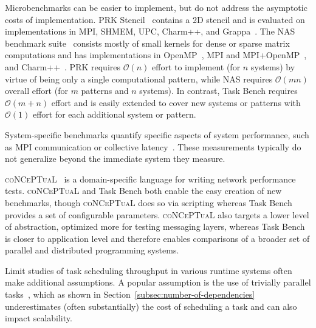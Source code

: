 Microbenchmarks can be easier to implement, but do not address the
asymptotic costs of implementation. PRK Stencil~\cite{PRK14} contains a
2D stencil and is evaluated on implementations in MPI, SHMEM, UPC,
Charm++, and Grappa~\cite{PRKRuntimes16}. The NAS benchmark
suite~\cite{NAS91, NAS95} consists mostly of small kernels for dense
or sparse matrix computations and has implementations in
OpenMP~\cite{NASOpenMP99}, MPI and MPI+OpenMP~\cite{NASMPIOpenMP00},
and Charm++~\cite{NASCharm96}. PRK requires $\mathcal{O}(n)$ effort to
implement (for $n$ systems) by virtue of being only a single
computational pattern, while NAS requires $\mathcal{O}(mn)$ overall
effort (for $m$ patterns and $n$ systems). In contrast, Task Bench
requires $\mathcal{O}(m+n)$ effort and is easily extended to cover new
systems or patterns with $\mathcal{O}(1)$ effort for each additional
system or pattern.

System-specific benchmarks quantify specific aspects
of system performance, such as MPI communication or collective
latency~\cite{MPPTest99, MPIBench01}. These measurements typically do
not generalize beyond the immediate system they measure.

\textsc{coNCePTuaL}~\cite{Conceptual07} is a domain-specific language
for writing network performance tests. \textsc{coNCePTuaL} and Task
Bench both enable the easy creation of new benchmarks, though
\textsc{coNCePTuaL} does so via scripting whereas Task Bench provides
a set of configurable parameters. \textsc{coNCePTuaL} also targets a
lower level of abstraction, optimized more for testing messaging
layers, whereas Task Bench is closer to application level and
therefore enables comparisons of a broader set of parallel and
distributed programming systems.

Limit studies of task scheduling throughput in various runtime systems
often make additional assumptions. A popular assumption is the use of
trivially parallel tasks~\cite{Canary16, Armstrong14}, which as shown
in Section~\ref{subsec:number-of-dependencies} underestimates (often
substantially) the cost of scheduling a task and can also impact scalability.
